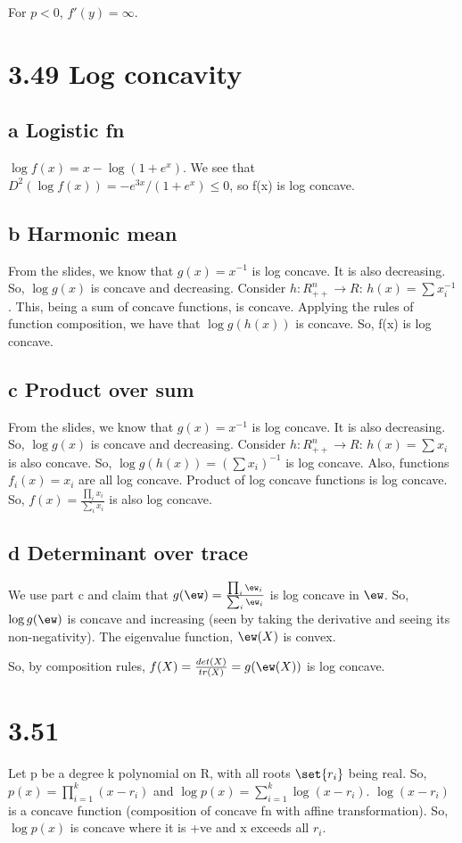 \documentclass{article}
\begin{document}
For $p<0$, $f'(y) = \infty$.

\section{3.49 Log concavity}
\subsection{a Logistic fn}
$\log f(x) = x - \log (1+e^{x})$. We see that $D^{2}(\log f(x)) = -e^{3x}/(1+e^{x}) \leq 0$, so f(x) is log concave.

\subsection{b Harmonic mean}
From the slides, we know that $g(x) = x^{-1}$ is log concave. It is also decreasing. So, $\log g(x)$ is concave and decreasing. Consider $h:R^{n}_{++} \to R$: $h(x) = \sum x_i^{-1}$. This, being a sum of concave functions, is concave. Applying the rules of function composition, we have that $\log g(h(x))$ is concave. So, f(x) is log concave.


\subsection{c Product over sum}
From the slides, we know that $g(x) = x^{-1}$ is log concave. It is also decreasing. So, $\log g(x)$ is concave and decreasing. Consider $h:R^{n}_{++} \to R$: $h(x) = \sum x_i$ is also concave. So, $\log g(h(x)) = (\sum x_i)^{-1}$ is log concave. Also, functions $f_i(x) = x_i$ are all log concave. Product of log concave functions is log concave. So, $f(x) = \frac{\prod_i x_i}{\sum_i x_i}$ is also log concave.

\subsection{d Determinant over trace}
We use part c and claim that $g(\ew) =  \frac{\prod_i \ew_i}{\sum_i \ew_i}$ is log concave in $\ew$. So, $\log g(\ew)$ is concave and increasing (seen by taking the derivative and seeing its non-negativity). The eigenvalue function, $\ew(X)$ is convex.

So, by composition rules, $f(X) = \frac{det(X)}{tr(X)} = g(\ew(X))$ is log concave.

\section{3.51}
Let p be a degree k polynomial on R, with all roots $\set{r_i}$ being real. So, $p(x) = \prod_{i=1}^{k} (x - r_i)$ and $\log p(x) = \sum_{i=1}^{k} \log (x - r_i)$. $\log (x - r_i)$ is a concave function (composition of concave fn with affine transformation). So, $\log p(x)$ is concave where it is +ve and x exceeds all $r_i$.


% 
% 
\end{document}
